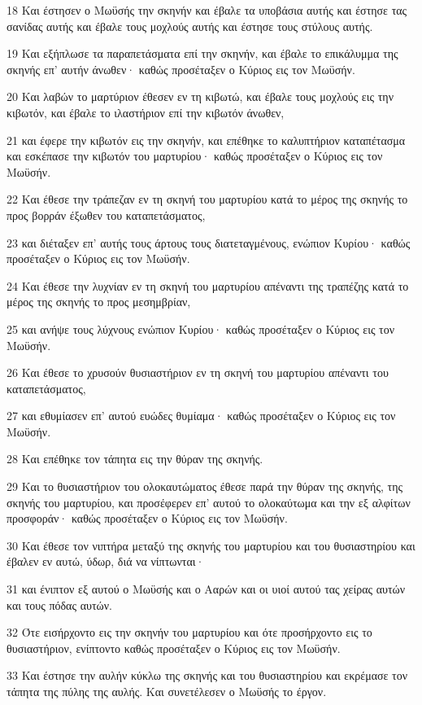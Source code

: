 \par 18 Και έστησεν ο Μωϋσής την σκηνήν και έβαλε τα υποβάσια αυτής και έστησε τας σανίδας αυτής και έβαλε τους μοχλούς αυτής και έστησε τους στύλους αυτής.
\par 19 Και εξήπλωσε τα παραπετάσματα επί την σκηνήν, και έβαλε το επικάλυμμα της σκηνής επ' αυτήν άνωθεν· καθώς προσέταξεν ο Κύριος εις τον Μωϋσήν.
\par 20 Και λαβών το μαρτύριον έθεσεν εν τη κιβωτώ, και έβαλε τους μοχλούς εις την κιβωτόν, και έβαλε το ιλαστήριον επί την κιβωτόν άνωθεν,
\par 21 και έφερε την κιβωτόν εις την σκηνήν, και επέθηκε το καλυπτήριον καταπέτασμα και εσκέπασε την κιβωτόν του μαρτυρίου· καθώς προσέταξεν ο Κύριος εις τον Μωϋσήν.
\par 22 Και έθεσε την τράπεζαν εν τη σκηνή του μαρτυρίου κατά το μέρος της σκηνής το προς βορράν έξωθεν του καταπετάσματος,
\par 23 και διέταξεν επ' αυτής τους άρτους τους διατεταγμένους, ενώπιον Κυρίου· καθώς προσέταξεν ο Κύριος εις τον Μωϋσήν.
\par 24 Και έθεσε την λυχνίαν εν τη σκηνή του μαρτυρίου απέναντι της τραπέζης κατά το μέρος της σκηνής το προς μεσημβρίαν,
\par 25 και ανήψε τους λύχνους ενώπιον Κυρίου· καθώς προσέταξεν ο Κύριος εις τον Μωϋσήν.
\par 26 Και έθεσε το χρυσούν θυσιαστήριον εν τη σκηνή του μαρτυρίου απέναντι του καταπετάσματος,
\par 27 και εθυμίασεν επ' αυτού ευώδες θυμίαμα· καθώς προσέταξεν ο Κύριος εις τον Μωϋσήν.
\par 28 Και επέθηκε τον τάπητα εις την θύραν της σκηνής.
\par 29 Και το θυσιαστήριον του ολοκαυτώματος έθεσε παρά την θύραν της σκηνής, της σκηνής του μαρτυρίου, και προσέφερεν επ' αυτού το ολοκαύτωμα και την εξ αλφίτων προσφοράν· καθώς προσέταξεν ο Κύριος εις τον Μωϋσήν.
\par 30 Και έθεσε τον νιπτήρα μεταξύ της σκηνής του μαρτυρίου και του θυσιαστηρίου και έβαλεν εν αυτώ, ύδωρ, διά να νίπτωνται·
\par 31 και ένιπτον εξ αυτού ο Μωϋσής και ο Ααρών και οι υιοί αυτού τας χείρας αυτών και τους πόδας αυτών.
\par 32 Ότε εισήρχοντο εις την σκηνήν του μαρτυρίου και ότε προσήρχοντο εις το θυσιαστήριον, ενίπτοντο καθώς προσέταξεν ο Κύριος εις τον Μωϋσήν.
\par 33 Και έστησε την αυλήν κύκλω της σκηνής και του θυσιαστηρίου και εκρέμασε τον τάπητα της πύλης της αυλής. Και συνετέλεσεν ο Μωϋσής το έργον.
